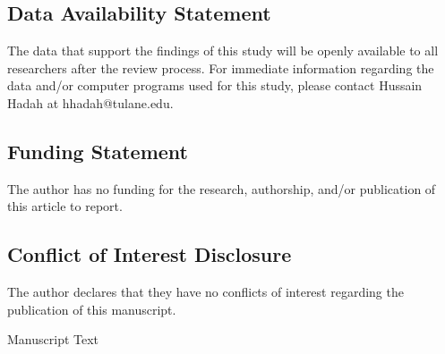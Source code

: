 \documentclass[12pt,english]{article}
\begin{document}
\subsection*{Data Availability Statement}
The data that support the findings of this study will be openly available to all researchers after the review process. For immediate information regarding the data and/or computer programs used for this study, please contact Hussain Hadah at hhadah@tulane.edu.

\subsection*{Funding Statement}

The author has no funding for the research, authorship, and/or publication of this article to report.

\subsection*{Conflict of Interest Disclosure}
The author declares that they have no conflicts of interest regarding the publication of this manuscript.

\clearpage 


\setcounter{page}{1}
\renewcommand*{\thefootnote}{\arabic{footnote}}
\doublespacing
\begingroup
  \centering
  \Large Manuscript Text\\[1em]
\endgroup


\newpage
\begingroup
{}
\setlength\bibitemsep{5.0pt}
\printbibliography[title=References for Manuscript]
\endgroup
\pagebreak






% 


\end{document}
